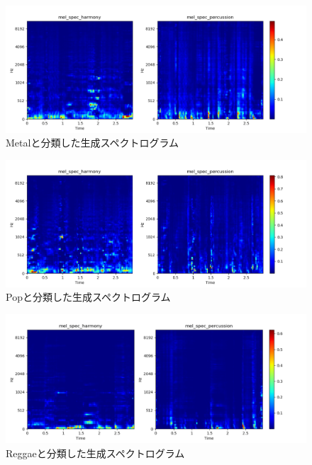 \begin{figure}[htbp]
	\begin{center}
		\includegraphics[scale=0.51]{./images/generate-model/gen-metal.png}
		\caption{Metalと分類した生成スペクトログラム}
		\label{fig:generate-metal}
	\end{center}
\end{figure}
\begin{figure}[htbp]
	\begin{center}
		\includegraphics[scale=0.51]{./images/generate-model/gen-pop.png}
		\caption{Popと分類した生成スペクトログラム}
		\label{fig:generate-popl}
	\end{center}
\end{figure}
\begin{figure}[htbp]
	\begin{center}
		\includegraphics[scale=0.51]{./images/generate-model/gen-reggae.png}
		\caption{Reggaeと分類した生成スペクトログラム}
		\label{fig:generate-reggae}
	\end{center}
\end{figure}
